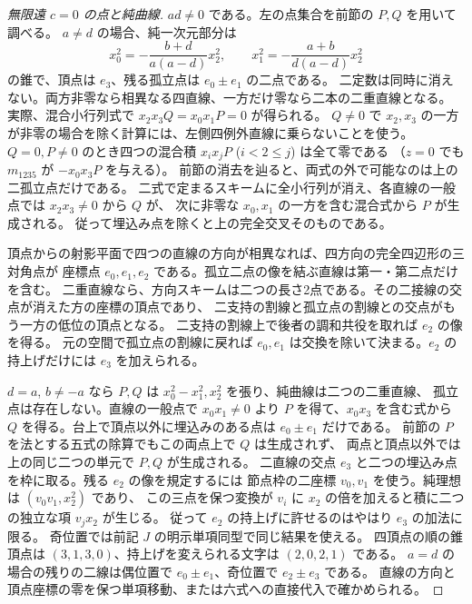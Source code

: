 \begin{proof}[無限遠 $c=0$ の点と純曲線]
$ad\ne0$ である。左の点集合を前節の $P,Q$ を用いて調べる。
$a\ne d$ の場合、純一次元部分は
\[
 x_0^2=-\frac{b+d}{a(a-d)}x_2^2,\qquad
 x_1^2=-\frac{a+b}{d(a-d)}x_2^2
\]
の錐で、頂点は $e_3$、残る孤立点は $e_0\pm e_1$ の二点である。
二定数は同時に消えない。両方非零なら相異なる四直線、一方だけ零なら二本の二重直線となる。
実際、混合小行列式で $x_2x_3Q=x_0x_1P=0$ が得られる。
$Q\ne0$ で $x_2,x_3$ の一方が非零の場合を除く計算には、左側四例外直線に乗らないことを使う。
$Q=0,P\ne0$ のとき四つの混合積 $x_ix_jP$ ($i<2\le j$) は全て零である
（$z=0$ でも $m_{1235}$ が $-x_0x_3P$ を与える）。
前節の消去を辿ると、両式の外で可能なのは上の二孤立点だけである。
二式で定まるスキームに全小行列が消え、各直線の一般点では $x_2x_3\ne0$ から $Q$ が、
次に非零な $x_0,x_1$ の一方を含む混合式から $P$ が生成される。
従って埋込み点を除くと上の完全交叉そのものである。

頂点からの射影平面で四つの直線の方向が相異なれば、四方向の完全四辺形の三対角点が
座標点 $e_0,e_1,e_2$ である。孤立二点の像を結ぶ直線は第一・第二点だけを含む。
二重直線なら、方向スキームは二つの長さ2点である。その二接線の交点が消えた方の座標の頂点であり、
二支持の割線と孤立点の割線との交点がもう一方の低位の頂点となる。
二支持の割線上で後者の調和共役を取れば $e_2$ の像を得る。
元の空間で孤立点の割線に戻れば $e_0,e_1$ は交換を除いて決まる。$e_2$ の持上げだけには $e_3$ を加えられる。

$d=a$, $b\ne-a$ なら $P,Q$ は $x_0^2-x_1^2,x_2^2$ を張り、純曲線は二つの二重直線、
孤立点は存在しない。直線の一般点で $x_0x_1\ne0$ より $P$ を得て、$x_0x_3$ を含む式から
$Q$ を得る。台上で頂点以外に埋込みのある点は $e_0\pm e_1$ だけである。
前節の $P$ を法とする五式の除算でもこの両点上で $Q$ は生成されず、
両点と頂点以外では上の同じ二つの単元で $P,Q$ が生成される。
二直線の交点 $e_3$ と二つの埋込み点を枠に取る。残る $e_2$ の像を規定するには
節点枠の二座標 $v_0,v_1$ を使う。純理想は $(v_0v_1,x_2^2)$ であり、
この三点を保つ変換が $v_i$ に $x_2$ の倍を加えると積に二つの独立な項 $v_j x_2$ が生じる。
従って $e_2$ の持上げに許せるのはやはり $e_3$ の加法に限る。
奇位置では前記 $J$ の明示単項同型で同じ結果を使える。
四頂点の順の錐頂点は $(3,1,3,0)$、持上げを変えられる文字は $(2,0,2,1)$ である。
$a=d$ の場合の残りの二線は偶位置で $e_0\pm e_1$、奇位置で $e_2\pm e_3$ である。
直線の方向と頂点座標の零を保つ単項移動、または六式への直接代入で確かめられる。
\end{proof}

